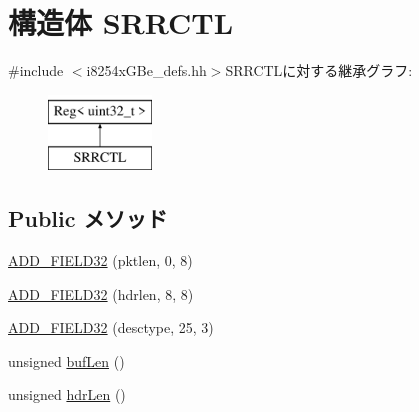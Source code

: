 \hypertarget{structiGbReg_1_1Regs_1_1SRRCTL}{
\section{構造体 SRRCTL}
\label{structiGbReg_1_1Regs_1_1SRRCTL}
}


{\ttfamily \#include $<$i8254xGBe\_\-defs.hh$>$}SRRCTLに対する継承グラフ:\begin{figure}[H]
\begin{center}
\leavevmode
\includegraphics[height=2cm]{structiGbReg_1_1Regs_1_1SRRCTL}
\end{center}
\end{figure}
\subsection*{Public メソッド}
\begin{DoxyCompactItemize}
\item 
\hyperlink{structiGbReg_1_1Regs_1_1SRRCTL_ad11a81dffaaccbbfdaee8a5d02201844}{ADD\_\-FIELD32} (pktlen, 0, 8)
\item 
\hyperlink{structiGbReg_1_1Regs_1_1SRRCTL_adc42d7a5ef8216877f9c954dd2fc69cb}{ADD\_\-FIELD32} (hdrlen, 8, 8)
\item 
\hyperlink{structiGbReg_1_1Regs_1_1SRRCTL_a7bfedea133db775b9f346331105a40fb}{ADD\_\-FIELD32} (desctype, 25, 3)
\item 
unsigned \hyperlink{structiGbReg_1_1Regs_1_1SRRCTL_ac3dd2dcc7ca5bde8f5c85307608291bf}{bufLen} ()
\item 
unsigned \hyperlink{structiGbReg_1_1Regs_1_1SRRCTL_ae045a09118af243b7abba05e4d4eefbb}{hdrLen} ()
\end{DoxyCompactItemize}


